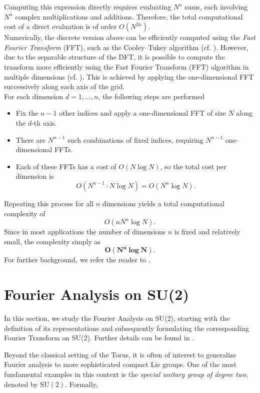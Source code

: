 \documentclass[11pt]{article}
\theoremstyle{definition}
\theoremstyle{remark}
\numberwithin{equation}{section}
\begin{document}
Computing this expression directly requires evaluating $N^n$ sums, each involving $N^n$ complex multiplications and additions. Therefore, the total computational cost of a direct evaluation is of order $O(N^{2n})$.\\%

Numerically, the discrete version above can be efficiently computed using the \textit{Fast Fourier Transform} (FFT), such as the Cooley–Tukey algorithm (cf. \cite{Cooley-Tukey}). However, due to the separable structure of the DFT, it is possible to compute the transform more efficiently using the Fast Fourier Transform (FFT) algorithm in multiple dimensions (cf. \cite{Cooley-Tukey,Toro2}). This is achieved by applying the one-dimensional FFT successively along each axis of the grid.\\%

For each dimension $d = 1, \dots, n$, the following steps are performed
\begin{itemize}
    \item Fix the $n - 1$ other indices and apply a one-dimensional FFT of size $N$ along the $d$-th axis.
 \item There are $N^{n-1}$ such combinations of fixed indices, requiring $N^{n-1}$ one-dimensional FFTs.
\item  Each of these FFTs has a cost of $O(N \log N)$, so the total cost per dimension is
\[
O(N^{n-1} \cdot N \log N) = O(N^n \log N).
\]
\end{itemize}
Repeating this process for all $n$ dimensions yields a total computational complexity of
\[
O(n N^n \log N).
\]
Since in most applications the number of dimensions $n$ is fixed and relatively small, the complexity simply as
\[
\boldsymbol{O(N^n \log N).}
\]
For further background, we refer the reader to \cite{FFTmulti-general}.\\%


\section{Fourier Analysis on SU(2)}\label{SEC:FAus2}
In this section, we study the Fourier Analysis on SU(2), starting with the definition of its representations and subsequently formulating the corresponding Fourier Transform on SU(2). Further details can be found in \cite{ruzhansky2009pseudo}.
\medskip

Beyond the classical setting of the Torus, it is often of interest to generalize Fourier analysis to more sophisticated compact Lie groups. One of the most fundamental examples in this context is the \textit{special unitary group of degree two}, denoted by $\text{SU}(2)$. Formally, 
\end{document}
